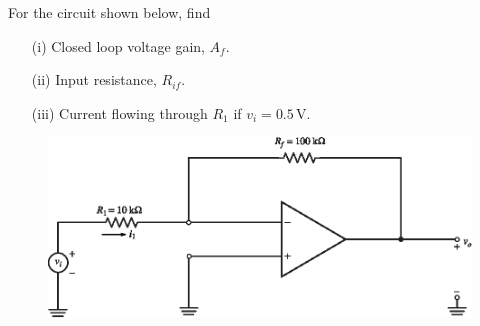 
\begin{example}\label{exam5.17}
For the circuit shown below, find
\begin{itemize}
\item[(i)] Closed loop voltage gain, $A_{f}$.

\item[(ii)] Input resistance, $R_{if}$.

\item[(iii)] Current flowing through $R_{1}$ if $v_{i}=0.5\,$V.
\end{itemize}
\begin{figure}[H]
\centering
\includegraphics{chap4/S3-EE-06-IN010.eps}
\end{figure}
\end{example}

